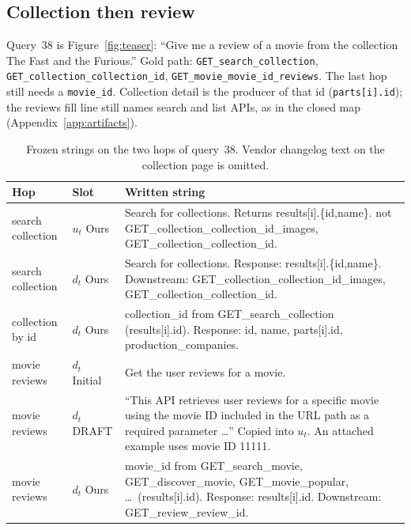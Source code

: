 \documentclass[11pt,a4paper]{article}
\begin{document}
\subsection{Collection then review}
\label{app:ex-review}

Query~38 is Figure~\ref{fig:teaser}: ``Give me a review of a movie from the collection The Fast and the Furious.'' Gold path: \texttt{GET\_search\_collection}, \texttt{GET\_collection\_collection\_id}, \texttt{GET\_movie\_movie\_id\_reviews}. The last hop still needs a \texttt{movie\_id}. Collection detail is the producer of that id (\texttt{parts[i].id}); the reviews fill line still names search and list APIs, as in the closed map (Appendix~\ref{app:artifacts}).

\begin{table}[H]
\centering
\caption{Frozen strings on the two hops of query~38. Vendor changelog text on the collection page is omitted.}
\label{tab:ex-review}
\footnotesize
\begin{tabular}{@{}l>{\raggedright\arraybackslash}p{2.1cm}>{\raggedright\arraybackslash}p{}@{}}
\toprule
Hop & Slot & Written string \\
\midrule
search collection & $u_t$ Ours & Search for collections. Returns results[i].\{id,name\}. not GET\_collection\_collection\_id\_images, GET\_collection\_collection\_id. \\
search collection & $d_t$ Ours & Search for collections. Response: results[i].\{id,name\}. Downstream: GET\_collection\_collection\_id\_images, GET\_collection\_collection\_id. \\
collection by id & $d_t$ Ours & collection\_id from GET\_search\_collection (results[i].id). Response: id, name, parts[i].id, production\_companies. \\
movie reviews & $d_t$ Initial & Get the user reviews for a movie. \\
movie reviews & $d_t$ DRAFT & ``This API retrieves user reviews for a specific movie using the movie ID included in the URL path as a required parameter \ldots'' Copied into $u_t$. An attached example uses movie ID 11111. \\
movie reviews & $d_t$ Ours & movie\_id from GET\_search\_movie, GET\_discover\_movie, GET\_movie\_popular, \ldots\ (results[i].id). Response: results[i].id. Downstream: GET\_review\_review\_id. \\
\bottomrule
\end{tabular}
\end{table}
\end{document}
